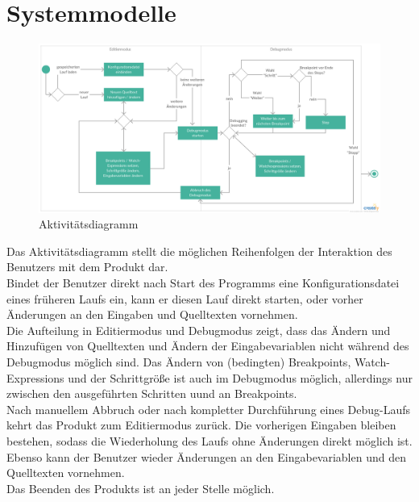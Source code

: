 \documentclass[parskip=full]{scrartcl}
\begin{document}
\section{Systemmodelle}
\begin{figure}[h] 
  \centering
     \includegraphics[width=1.0\textwidth]{Aktivitaetsdiagramm}
  \caption{Aktivitätsdiagramm}
  \label{fig:Bild2}
\end{figure}
\vspace{0.7cm}
Das Aktivitätsdiagramm stellt die möglichen Reihenfolgen der Interaktion des Benutzers mit dem Produkt dar. \\
Bindet der Benutzer direkt nach Start des Programms eine \gls{Konfigurationsdatei} eines früheren Laufs ein, kann er diesen Lauf direkt starten, oder vorher Änderungen an den Eingaben und Quelltexten vornehmen. \\
Die Aufteilung in \gls{Editiermodus} und \gls{Debugmodus} zeigt, dass das Ändern und Hinzufügen von Quelltexten und Ändern der Eingabevariablen nicht während des \gls{Debugmodus} möglich sind. Das Ändern von (bedingten) \glspl{Breakpoint}, \glspl{Watch-Expression} und der Schrittgröße ist auch im Debugmodus möglich, allerdings nur zwischen den ausgeführten Schritten uund an \glspl{Breakpoint}. \\
Nach manuellem Abbruch oder nach kompletter Durchführung eines Debug-Laufs kehrt das Produkt zum \gls{Editiermodus} zurück. Die vorherigen Eingaben bleiben bestehen, sodass die Wiederholung des Laufs ohne Änderungen direkt möglich ist. Ebenso kann der Benutzer wieder Änderungen an den Eingabevariablen und den Quelltexten vornehmen.\\
Das Beenden des Produkts ist an jeder Stelle möglich.

\newpage
\end{document}
